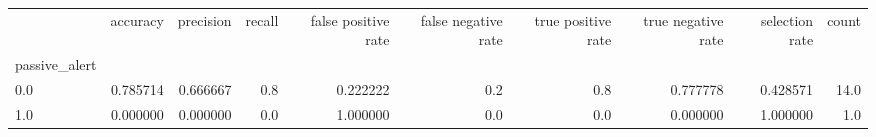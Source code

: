 \begin{tabular}{lrrrrrrrrr}
\toprule
{} &  accuracy &  precision &  recall &  false positive rate &  false negative rate &  true positive rate &  true negative rate &  selection rate &  count \\
passive\_alert &           &            &         &                      &                      &                     &                     &                 &        \\
\midrule
0.0           &  0.785714 &   0.666667 &     0.8 &             0.222222 &                  0.2 &                 0.8 &            0.777778 &        0.428571 &   14.0 \\
1.0           &  0.000000 &   0.000000 &     0.0 &             1.000000 &                  0.0 &                 0.0 &            0.000000 &        1.000000 &    1.0 \\
\bottomrule
\end{tabular}
